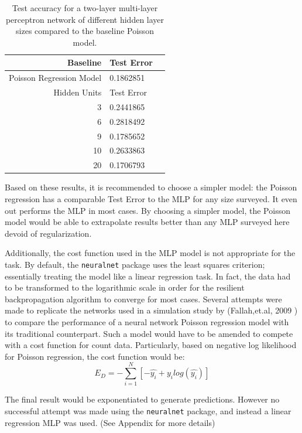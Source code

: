 \begin{table}[H]
\centering
\begin{tabular}{rlr}
  \hline
 Baseline & Test Error \\ 
  \hline
  Poisson Regression Model & 0.1862851 \\ 
  \hline
 Hidden Units & Test Error \\ 
  \hline
3 & 0.2441865 \\ 
  6 & 0.2818492 \\ 
  9 & 0.1785652 \\ 
  10 & 0.2633863 \\ 
  20 & 0.1706793 \\ 
   \hline
\end{tabular}
   \caption{\footnotesize Test accuracy for a two-layer multi-layer perceptron network of different hidden layer sizes compared to the baseline Poisson model.}
\end{table}


Based on these results, it is recommended to choose a simpler model: the Poisson regression has a comparable Test Error to the MLP for any size surveyed.  It even out performs the MLP in most cases.  By choosing a simpler model, the Poisson model would be able to extrapolate results better than any MLP surveyed here devoid of regularization.

Additionally, the cost function used in the MLP model is not appropriate for the task.  By default, the \texttt{neuralnet} package uses the least squares criterion; essentially treating the model like a linear regression task.  In fact, the data had to be transformed to the logarithmic scale in order for the resilient backpropagation algorithm to converge for most cases.  Several attempts were made to replicate the networks used in a simulation study by (Fallah,et.al, 2009 \cite{fallah2009nonlinear}) to compare the performance of a neural network Poisson regression model with its traditional counterpart.  Such a model would have to be amended to compete with a cost function for count data.  Particularly, based on negative log likelihood for Poisson regression, the cost function would be:
$$
E_D = - \sum_{i=1}^N \left[ -\hat{y_i} + y_i log(\hat{y_i}) \right]
$$

The final result would be exponentiated to generate predictions.
However no successful attempt was made using the \texttt{neuralnet} package, and instead a linear regression MLP was used. (See Appendix for more details)
